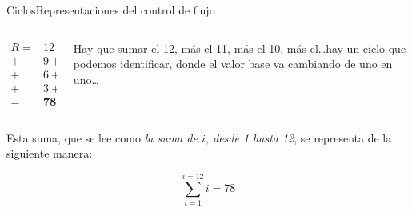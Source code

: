\documentclass[spanish, c]{beamer}
\begin{document}
\begin{frame}{Ciclos}{Representaciones del control de flujo}

    \begin{columns}
        \begin{column}{0.5\linewidth}
            \begin{align*}
                R = & 12  + 11 + 10 \\
                  + &  9 + 8 + 7 \\
                  + &  6 + 5 + 4 \\
                  + &  3 + 2 + 1 \\
                  = & \mathbf{78}
            \end{align*} \pause
        \end{column}

        \begin{column}{0.5\linewidth}
            Hay que sumar el 12, más el 11, más el 10, más el\dots hay un ciclo que podemos identificar, donde el \alert{valor base} va cambiando de uno en uno\dots \pause
        \end{column}
    \end{columns}

    Esta suma, que se lee como \textit{la suma de $i$, desde 1 hasta 12}, se representa de la siguiente manera:
    
    $$\sum\limits_{i=1}^{i=12} i = 78$$
\end{frame}




\end{document}
